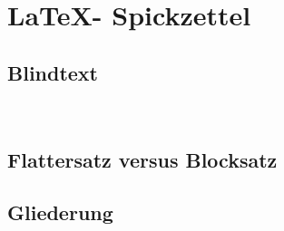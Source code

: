 %
\section{\LaTeX - Spickzettel}\label{sec:LaTeX-Spickzettel}

\subsection{Blindtext}\label{sec:blindtext}

\blindtext[1] \\ \blindtext[1]

\subsection{Flattersatz versus Blocksatz}\label{sec:Flattersatz-versus-Blocksatz}

\begin{flushleft}
\blindtext[1]
\end{flushleft}

\begin{flushright}
\blindtext[1]
\end{flushright}

\begin{center}
\blindtext[1]
\end{center}

\newpage %

\subsection{Gliederung}

